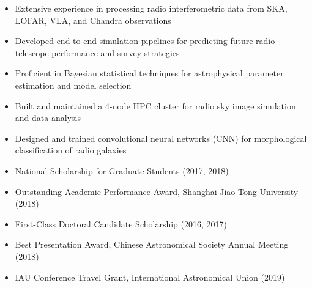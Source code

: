 \documentclass{resume}
\begin{document}

\begin{competences}
\end{competences}

\begin{itemize}
  \item Extensive experience in processing radio interferometric data
    from SKA, LOFAR, VLA, and Chandra observations
  \item Developed end-to-end simulation pipelines for predicting
    future radio telescope performance and survey strategies
  \item Proficient in Bayesian statistical techniques for astrophysical
    parameter estimation and model selection
  \item Built and maintained a 4-node HPC cluster for radio sky
    image simulation and data analysis
  \item Designed and trained convolutional neural networks (CNN) for
    morphological classification of radio galaxies
\end{itemize}


\begin{itemize}
  \item National Scholarship for Graduate Students (2017, 2018)
  \item Outstanding Academic Performance Award, Shanghai Jiao Tong University (2018)
  \item First-Class Doctoral Candidate Scholarship (2016, 2017)
  \item Best Presentation Award, Chinese Astronomical Society Annual Meeting (2018)
  \item IAU Conference Travel Grant, International Astronomical Union (2019)
\end{itemize}
\end{document}
